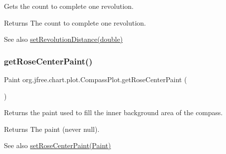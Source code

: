Gets the count to complete one revolution.

\begin{DoxyReturn}{Returns}
The count to complete one revolution.
\end{DoxyReturn}
\begin{DoxySeeAlso}{See also}
\mbox{\hyperlink{classorg_1_1jfree_1_1chart_1_1plot_1_1_compass_plot_af4c2e6bbaa76fa95d34cc0fd3b6237fe}{set\+Revolution\+Distance(double)}} 
\end{DoxySeeAlso}
\mbox{\label{classorg_1_1jfree_1_1chart_1_1plot_1_1_compass_plot_a750f550a147200d68f767c7cd367876e}} 
\subsubsection{\texorpdfstring{get\+Rose\+Center\+Paint()}{getRoseCenterPaint()}}
{\footnotesize\ttfamily Paint org.\+jfree.\+chart.\+plot.\+Compass\+Plot.\+get\+Rose\+Center\+Paint (\begin{DoxyParamCaption}{ }\end{DoxyParamCaption})}

Returns the paint used to fill the inner background area of the compass.

\begin{DoxyReturn}{Returns}
The paint (never {\ttfamily null}).
\end{DoxyReturn}
\begin{DoxySeeAlso}{See also}
\mbox{\hyperlink{classorg_1_1jfree_1_1chart_1_1plot_1_1_compass_plot_a2fc72d27007f0762ae9c6dd6af65e971}{set\+Rose\+Center\+Paint(\+Paint)}} 
\end{DoxySeeAlso}
\mbox{\label{classorg_1_1jfree_1_1chart_1_1plot_1_1_compass_plot_a555cfe75f1011e0e8bcd236a6fc865aa}} 
